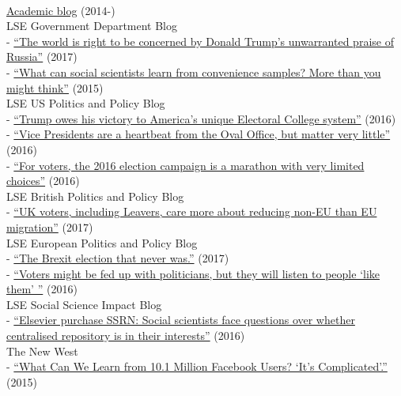 \documentclass[12pt]{article}
\newcommand{\topic}[1]{\pagebreak[3]\indent {\color{lg}{\footnotesize #1 }}\\}
\newcommand{\entry}[1]{\indent {\color{lg}\guillemotright}\hspace{2pt}#1\vspace{.25em}\\}
\newcommand{\subentry}[1]{{\color{lg}-} #1\vspace{.25em}\\}
\begin{document}
	\topic{Occasional Blogging}
		\entry{\href{http://thomasleeper.com/blog}{Academic blog} (2014-)}
		\entry{LSE Government Department Blog}
			\subentry{\href{http://blogs.lse.ac.uk/government/2017/01/09/the-world-is-right-to-be-concerned-by-donald-trumps-unwarranted-praise-of-russia/}{``The world is right to be concerned by Donald Trump's unwarranted praise of Russia''} (2017)}
			\subentry{\href{http://blogs.lse.ac.uk/government/2016/01/14/what-can-social-scientists-learn-from-convenience-samples-more-than-you-might-think/}{``What can social scientists learn from convenience samples? More than you might think''} (2015)}
		\entry{LSE US Politics and Policy Blog}
			\subentry{\href{http://blogs.lse.ac.uk/usappblog/2016/11/10/trump-owes-his-victory-to-americas-unique-electoral-college-system/}{``Trump owes his victory to America's unique Electoral College system''} (2016)}
			\subentry{\href{http://blogs.lse.ac.uk/usappblog/2016/10/05/vice-presidents-are-a-heartbeat-from-the-oval-office-but-matter-very-little/}{``Vice Presidents are a heartbeat from the Oval Office, but matter very little''} (2016)}
			\subentry{\href{http://blogs.lse.ac.uk/usappblog/2016/09/23/for-voters-the-2016-election-campaign-is-a-marathon-with-very-limited-choices/}{``For voters, the 2016 election campaign is a marathon with very limited choices''} (2016)}
		\entry{LSE British Politics and Policy Blog}
			\subentry{\href{http://blogs.lse.ac.uk/politicsandpolicy/non-eu-migration-is-what-uk-voters-care-most-about/}{``UK voters, including Leavers, care more about reducing non-EU than EU migration''} (2017)}
        \entry{LSE European Politics and Policy Blog}
			\subentry{\href{http://blogs.lse.ac.uk/europpblog/2017/06/07/uk-general-election-preview-what-to-look-out-for-as-britain-goes-to-the-polls/}{``The Brexit election that never was.''} (2017)}
            \subentry{\href{http://blogs.lse.ac.uk/europpblog/2016/06/23/voters-listen-people-like-them/}{``Voters might be fed up with politicians, but they will listen to people `like them' ''} (2016)}
		\entry{LSE Social Science Impact Blog}
			\subentry{\href{http://blogs.lse.ac.uk/impactofsocialsciences/2016/05/18/elsevier-purchase-ssrn-social-scientists-face-questions-over-whether-centralised-repository-is-in-their-interests/}{``Elsevier purchase SSRN: Social scientists face questions over whether centralised repository is in their interests''} (2016)}
		\entry{The New West}
			\subentry{\href{https://thewpsa.wordpress.com/2015/05/09/what-can-we-learn-from-10-1-million-facebook-users-its-complicated/}{``What Can We Learn from 10.1 Million Facebook Users? `It's Complicated'.''} (2015)}
\end{document}
